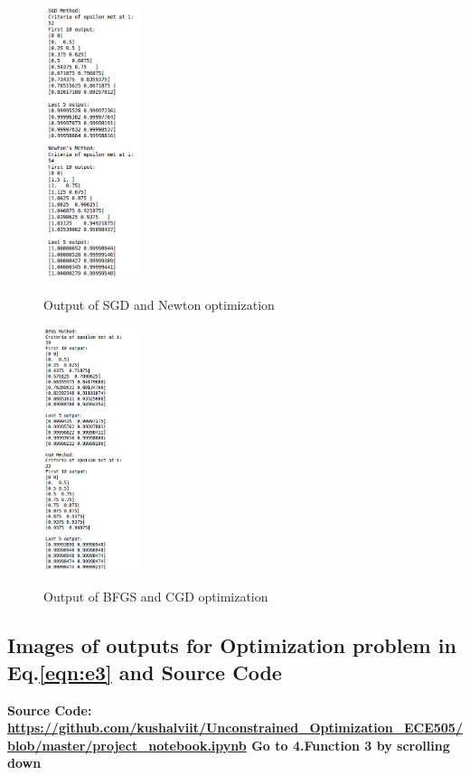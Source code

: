 \documentclass[paper=a4, fontsize=11pt]{scrartcl}
\numberwithin{equation}{section}		%
\numberwithin{figure}{section}			%
\numberwithin{table}{section}				%
\begin{document}
\begin{figure}[H]
\caption{Output of SGD and Newton optimization}
\centering
\includegraphics[width=0.25\textwidth]{out3.png}
\label{out3}
\end{figure}
\begin{figure}[H]
\caption{Output of BFGS and CGD optimization}
\centering
\includegraphics[width=0.25\textwidth]{out4.png}
\label{out4}
\end{figure}
\subsection*{Images of outputs for Optimization problem in Eq.\ref{eqn:e3} and Source Code}
\textbf{Source Code: \url{https://github.com/kushalviit/Unconstrained_Optimization_ECE505/blob/master/project_notebook.ipynb}
Go to 4.Function 3 by scrolling down}
\end{document}
